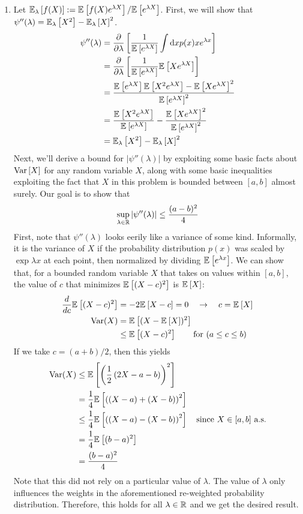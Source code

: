 \documentclass[11pt]{article}
\newcommand{\1}{\mathbb{I}} %
\begin{document}
\begin{enumerate}
	\item Let $\E[\lambda]{f(X)} := \E{f(X)e^{\lambda X}} / \E{e^{\lambda X}}$. First, we will show that $\psi''(\lambda) = \E[\lambda]{X^2} - \E[\lambda]{X}^2$. 
	\begin{align}
		\psi''(\lambda) 
			&= \pderiv{}{\lambda} \left[ 
				\inv{\E{e^{\lambda X}} } \int \mathrm{d}x  p(x) x e^{\lambda x} 
			\right] \\
			&=  \pderiv{}{\lambda} \left[ 
			\inv{\E{e^{\lambda X}} } \E{ X e^{\lambda X} }
			\right] \\
			&= \dfrac{ 
							\E{e^{\lambda X}} \E{X^2 e^{\lambda X}}
								-  \E{X e^{\lambda X}}^2
			}{
		 \E{e^{\lambda X}}^2
	} \\
	&= \frac{ \E{X^2 e^{\lambda X}} } { \E{e^{\lambda X}} }
	- \frac{ \E{X e^{\lambda X}}^2 }{ \E{e^{\lambda X}}^2 } \\
	&= \E[\lambda]{X^2} - \E[\lambda]{X}^2
	\end{align}
	Next, we'll derive a bound for $|\psi''(\lambda)|$ by exploiting some basic facts about $\Var{X}$ for any random variable $X$, along with some basic inequalities exploiting the fact that $X$ in this problem is bounded between $[a, b]$ almost surely. Our goal is to show that
	\begin{align}
		\sup_{\lambda \in \R} | \psi''(\lambda) | \leq \frac{(a-b)^2}{4}
	\end{align}
	First, note that $\psi''(\lambda)$ looks eerily like a variance of some kind. Informally, it is the variance of $X$ if the probability distribution $p(x)$ was scaled by $\exp{\lambda x}$ at each point, then normalized by dividing $\E{e^{\lambda x}}$. We can show that, for a bounded random variable $X$ that takes on values within $[a, b]$, the value of $c $ that  minimizes  $\E{(X-c)^2}$ is $\E{X}$:
	\begin{align}
		\deriv{}{c}\E{(X - c)^2}
			&= -2 \E{X - c} = 0 \quad \rightarrow \quad c = \E{X} \\
		\text{Var}(X) 
			&= \E{(X - \E{X})^2} \\
			&\leq \E{(X - c)^2} \qquad \text{for } (a \le c \le b)
	\end{align}
	If we take $c = (a+b)/2$, then this yields
	\begin{align}
		\text{Var}(X) 
			&\leq \E{  \lr{\onehalf \lr{   2X - a - b  }   }^2 } \\
			&= \inv{4} \E{ \lr{ (X -a) + (X - b) }^2  } \\
			&\leq \inv{4} \E{  \lr{  (X - a) - (X - b)}^2  } \quad \text{since $X \in [a, b]$ a.s.} \\
			&= \inv{4} \E{(b-a)^2} \\
			&= \frac{(b - a)^2}{4}
	\end{align}
	Note that this did not rely on a particular value of $\lambda$. The value of $\lambda$ only influences the weights in the aforementioned re-weighted probability distribution. Therefore, this holds for all $\lambda \in \R$ and we get the desired result.  
	

\end{enumerate}
\end{document}
